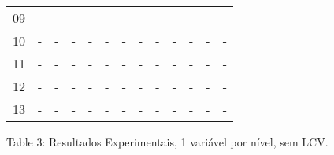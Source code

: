 \documentclass[12pt,a4paper]{article}
\begin{document}
\begin{adjustbox}{width={\textwidth}, totalheight={\textheight}, keepaspectratio}
\begin{tabular}{l cccc cccc cccc}
    09    & -                                          & -                               & -                                  & -          & -   & -    & -     & -          & -   & -    & -     & -          \\
    10    & -                                          & -                               & -                                  & -          & -   & -    & -     & -          & -   & -    & -     & -          \\
    11    & -                                          & -                               & -                                  & -          & -   & -    & -     & -          & -   & -    & -     & -          \\
    12    & -                                          & -                               & -                                  & -          & -   & -    & -     & -          & -   & -    & -     & -          \\
    13    & -                                          & -                               & -                                  & -          & -   & -    & -     & -          & -   & -    & -     & -          \\
    \bottomrule
  \end{tabular}
\end{adjustbox}

\vspace*{0.2cm}

\begin{center}
  Table 3: Resultados Experimentais, 1 variável por nível, sem LCV.
\end{center}
\end{document}
